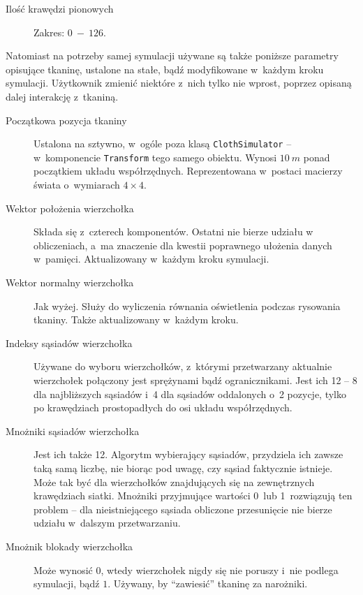 \begin{description}
			\item[Ilość krawędzi pionowych] Zakres: \(0\ -\ 126\).
			
		\end{description}
		
		Natomiast na potrzeby samej symulacji używane są także poniższe parametry opisujące tkaninę, ustalone na stałe, bądź modyfikowane w~każdym kroku symulacji. Użytkownik zmienić niektóre z~nich tylko nie wprost, poprzez opisaną dalej interakcję z~tkaniną.
		
		\begin{description}
			
			\item[Początkowa pozycja tkaniny] Ustalona na sztywno, w~ogóle poza klasą \texttt{ClothSimulator} -- w~komponencie \texttt{Transform} tego samego obiektu. Wynosi \(10\ m\) ponad początkiem układu współrzędnych. Reprezentowana w~postaci macierzy świata o~wymiarach \(4\times4 \).
			
			\item[Wektor położenia wierzchołka] Składa się z~czterech komponentów. Ostatni nie bierze udziału w obliczeniach, a~ma znaczenie dla kwestii poprawnego ułożenia danych w~pamięci. Aktualizowany w~każdym kroku symulacji.
			
			\item[Wektor normalny wierzchołka] Jak wyżej. Służy do wyliczenia równania oświetlenia podczas rysowania tkaniny. Także aktualizowany w~każdym kroku.
			
			\item[Indeksy sąsiadów wierzchołka] Używane do wyboru wierzchołków, z~którymi przetwarzany aktualnie wierzchołek połączony jest sprężynami bądź ogranicznikami. Jest ich 12 -- 8 dla najbliższych sąsiadów i~4 dla sąsiadów oddalonych o~2 pozycje, tylko po krawędziach prostopadłych do osi układu współrzędnych. 
			
			\item[Mnożniki sąsiadów wierzchołka] Jest ich także 12. Algorytm wybierający sąsiadów, przydziela ich zawsze taką samą liczbę, nie biorąc pod uwagę, czy sąsiad faktycznie istnieje. Może tak być dla wierzchołków znajdujących się na zewnętrznych krawędziach siatki. Mnożniki przyjmujące wartości 0~lub 1~rozwiązują ten problem -- dla nieistniejącego sąsiada obliczone przesunięcie nie bierze udziału w~dalszym przetwarzaniu.
			
			\item[Mnożnik blokady wierzchołka] Może wynosić \(0\), wtedy wierzchołek nigdy się nie poruszy i~nie podlega symulacji, bądź \(1\). Używany, by ``zawiesić'' tkaninę za narożniki.
			

\end{description}
